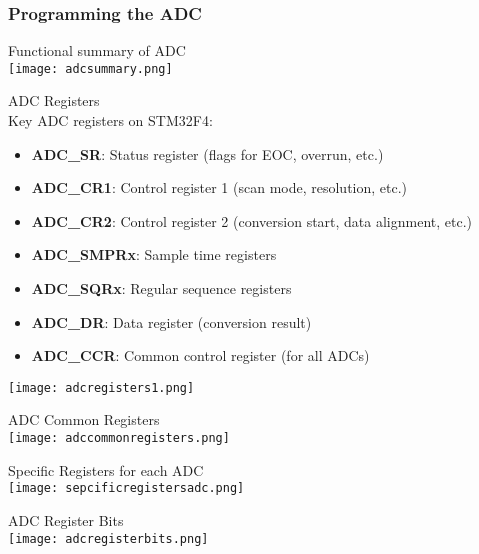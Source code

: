 \raggedcolumns
\columnbreak

\subsubsection{Programming the ADC}

\begin{definition}{Functional summary of ADC}\\
    \texttt{[image: adcsummary.png]}
\end{definition}

\begin{definition}{ADC Registers}\\
Key ADC registers on STM32F4:
\begin{itemize}
    \item \textbf{ADC\_SR}: Status register (flags for EOC, overrun, etc.)
    \item \textbf{ADC\_CR1}: Control register 1 (scan mode, resolution, etc.)
    \item \textbf{ADC\_CR2}: Control register 2 (conversion start, data alignment, etc.)
    \item \textbf{ADC\_SMPRx}: Sample time registers
    \item \textbf{ADC\_SQRx}: Regular sequence registers
    \item \textbf{ADC\_DR}: Data register (conversion result)
    \item \textbf{ADC\_CCR}: Common control register (for all ADCs)
\end{itemize}
\texttt{[image: adcregisters1.png]}\\
\end{definition}

\begin{concept}{ADC Common Registers}\\
    \texttt{[image: adccommonregisters.png]}
\end{concept}

\begin{concept}{Specific Registers for each ADC}\\
    \texttt{[image: sepcificregistersadc.png]}
\end{concept}

\begin{theorem}{ADC Register Bits}\\
    \texttt{[image: adcregisterbits.png]}
\end{theorem}

